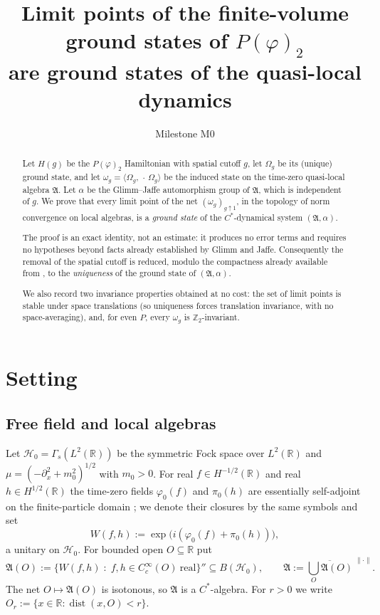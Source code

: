\documentclass[11pt,a4paper]{article}
\title{Limit points of the finite-volume ground states of $P(\varphi)_2$\\
are ground states of the quasi-local dynamics}
\author{Milestone M0}
\date{}
\theoremstyle{plain}
\theoremstyle{definition}
\newcommand{\A}{\mathfrak{A}}
\newcommand{\HH}{\mathcal{H}}
\newcommand{\R}{\mathbb{R}}
\newcommand{\Z}{\mathbb{Z}}
\newcommand{\Om}{\Omega}
\newcommand{\ip}[2]{\langle #1,#2\rangle}
\DeclareMathOperator{\dist}{dist}
\begin{document}
\maketitle

\begin{abstract}
Let $H(g)$ be the $P(\varphi)_2$ Hamiltonian with spatial cutoff $g$, let $\Om_g$ be its
(unique) ground state, and let $\omega_g=\ip{\Om_g}{\,\cdot\,\Om_g}$ be the induced state on the
time-zero quasi-local algebra $\A$. Let $\alpha$ be the Glimm--Jaffe automorphism group of $\A$,
which is independent of $g$. We prove that every limit point of the net $(\omega_g)_{g\uparrow 1}$,
in the topology of norm convergence on local algebras, is a \emph{ground state} of the
$C^*$-dynamical system $(\A,\alpha)$.

The proof is an exact identity, not an estimate: it produces no error terms and requires no
hypotheses beyond facts already established by Glimm and Jaffe. Consequently the removal of the
spatial cutoff is reduced, modulo the compactness already available from
\cite[Thm.~2.3]{GJIII}, to the \emph{uniqueness} of the ground state of $(\A,\alpha)$.

We also record two invariance properties obtained at no cost: the set of limit points is stable
under space translations (so uniqueness forces translation invariance, with no space-averaging),
and, for even $P$, every $\omega_g$ is $\Z_2$-invariant.
\end{abstract}

\section{Setting}\label{sec:setting}

\subsection{Free field and local algebras}

Let $\HH_0=\Gamma_s(L^2(\R))$ be the symmetric Fock space over $L^2(\R)$ and
$\mu=(-\partial_x^2+m_0^2)^{1/2}$ with $m_0>0$. For real $f\in H^{-1/2}(\R)$ and real
$h\in H^{1/2}(\R)$ the time-zero fields $\varphi_0(f)$ and $\pi_0(h)$ are essentially
self-adjoint on the finite-particle domain \cite[Prop.~1.2.6]{GJExp}; we denote their closures by
the same symbols and set
\[
  W(f,h):=\exp\bigl(i(\varphi_0(f)+\pi_0(h))\bigr),
\]
a unitary on $\HH_0$. For bounded open $O\subseteq\R$ put
\[
  \A(O):=\{W(f,h)\;:\;f,h\in C_c^\infty(O)\ \text{real}\}''\subseteq B(\HH_0),
  \qquad
  \A:=\overline{\textstyle\bigcup_{O}\A(O)}^{\;\|\cdot\|}.
\]
The net $O\mapsto\A(O)$ is isotonous, so $\A$ is a $C^*$-algebra. For $r>0$ we write
$O_r:=\{x\in\R:\dist(x,O)<r\}$.
\end{document}
